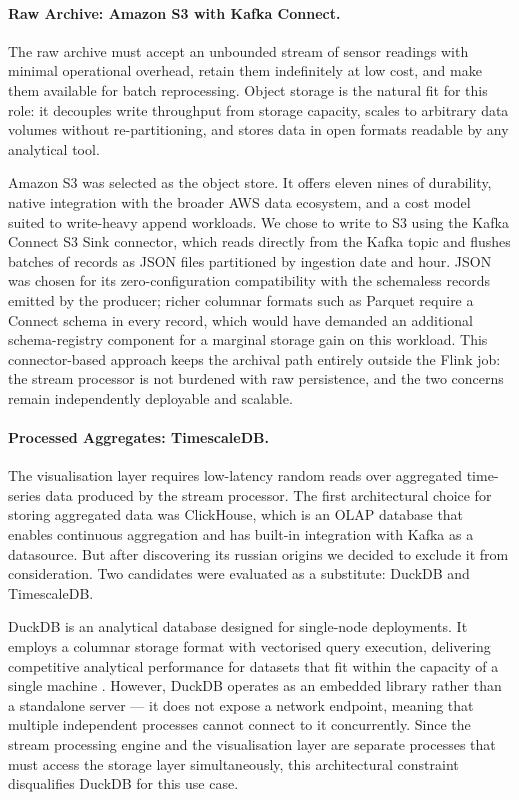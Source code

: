 \paragraph{Raw Archive: Amazon S3 with Kafka Connect.}
The raw archive must accept an unbounded stream of sensor readings with minimal operational overhead, retain them indefinitely at low cost, and make them available for batch reprocessing. Object storage is the natural fit for this role: it decouples write throughput from storage capacity, scales to arbitrary data volumes without re-partitioning, and stores data in open formats readable by any analytical tool.

Amazon S3 was selected as the object store. It offers eleven nines of durability, native integration with the broader AWS data ecosystem, and a cost model suited to write-heavy append workloads. We chose to write to S3 using the Kafka Connect S3 Sink connector, which reads directly from the Kafka topic and flushes batches of records as JSON files partitioned by ingestion date and hour. JSON was chosen for its zero-configuration compatibility with the schemaless records emitted by the producer; richer columnar formats such as Parquet require a Connect schema in every record, which would have demanded an additional schema-registry component for a marginal storage gain on this workload. This connector-based approach keeps the archival path entirely outside the Flink job: the stream processor is not burdened with raw persistence, and the two concerns remain independently deployable and scalable.

\paragraph{Processed Aggregates: TimescaleDB.}
The visualisation layer requires low-latency random reads over aggregated time-series data produced by the stream processor. The first architectural choice for storing aggregated data was ClickHouse, which is an OLAP database that enables continuous aggregation and has built-in integration with Kafka as a datasource. But after discovering its russian origins we decided to exclude it from consideration. Two candidates were evaluated as a substitute: DuckDB and TimescaleDB.

DuckDB is an analytical database designed for single-node deployments. It employs a columnar storage format with vectorised query execution, delivering competitive analytical performance for datasets that fit within the capacity of a single machine \cite{duckdb}. However, DuckDB operates as an embedded library rather than a standalone server — it does not expose a network endpoint, meaning that multiple independent processes cannot connect to it concurrently. Since the stream processing engine and the visualisation layer are separate processes that must access the storage layer simultaneously, this architectural constraint disqualifies DuckDB for this use case.

